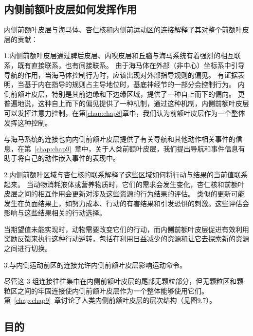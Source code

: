 \subsection{内侧前额叶皮层如何发挥作用}

内侧前额叶皮层与海马体、杏仁核和内侧前运动区的连接解释了其对整个前额叶皮层的贡献：\par

1.内侧前额叶皮层通过脾后皮层、内嗅皮层和丘脑与海马系统有着强烈的相互联系，既有直接联系，也有间接联系。
由于海马体在外部（非中心）坐标系中引导导航的作用，当海马体控制行为时，应该出现对外部指导规则的偏见。
有证据表明，当基于内在指导的规则占主导地位时，基底神经节的一部分会控制行为\cite{packard1996inactivation}。
内侧前额叶皮层，特别是其前边缘和下边缘区域，提供了一种自上而下的偏向。
更普遍地说，这种自上而下的偏见提供了一种机制，通过这种机制，内侧前额叶皮层可以发挥注意力控制，在第\ref{chap:chap8}章中，我们认为前额叶皮层作为一个整体发挥这种控制。\par


与海马系统的连接也向内侧前额叶皮层提供了有关导航和其他动作相关事件的信息，在第~\ref{chap:chap9}~章中，关于人类前额叶皮层，我们提出导航和事件信息有助于将自己的动作嵌入事件的表现中。\par


2.内侧前额叶区域与杏仁核的联系解释了这些区域如何将行动与结果的当前值联系起来。
当动物消耗液体或营养物质时，它们的需求会发生变化，杏仁核和前额叶皮层之间的相互作用会更新对涉及这些资源的行为结果的评估。
类似的更新可能发生在负面结果上，如努力成本、行动的有害结果和引发恐惧的刺激。这些评估会影响与这些结果相关的行动选择。\par


当期望值未能实现时，动物需要改变它们的行动，而内侧前额叶皮层促进有效利用奖励反馈来执行这种行动逆转，包括在利用日益减少的资源和让它去探索新的资源之间进行切换。\par


3.与内侧运动前区的连接允许内侧前额叶皮层影响运动命令。\par

尽管这 3 组连接往往集中在内侧前额叶皮层的尾部无颗粒部分，但无颗粒区和颗粒区之间的牢固连接使内侧前额叶皮层作为一个整体能够使用它们。
第~\ref{chap:chap9}~章讨论了人类内侧前额叶皮层的层次结构（见图9.7）。\par



\subsection{目的}

